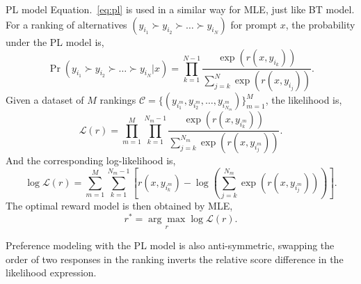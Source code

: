 PL model Equation.~\ref{eq:pl} is used in a similar way for MLE, just like BT model. For a ranking of alternatives $(y_{i_1} \succ y_{i_2} \succ \ldots \succ y_{i_N})$ for prompt $x$, the probability under the PL model is,
\begin{equation}
	\Pr(y_{i_1} \succ y_{i_2} \succ \ldots \succ y_{i_N} | x) = \prod_{k=1}^{N-1} \frac{\exp(r(x, y_{i_k}))}{\sum_{j=k}^{N} \exp(r(x, y_{i_j}))}.
\end{equation}
Given a dataset of $M$ rankings $\mathcal{C} = \{(y_{i_1^m}, y_{i_2^m}, \ldots, y_{i_{N_m}^m})\}_{m=1}^M$, the likelihood is,
\begin{equation}
	\mathcal{L}(r) = \prod_{m=1}^{M} \prod_{k=1}^{N_m-1} \frac{\exp(r(x, y_{i_k^m}))}{\sum_{j=k}^{N_m} \exp(r(x, y_{i_j^m}))}.
\end{equation}
And the corresponding log-likelihood is,
\begin{equation}
\log \mathcal{L}(r) = \sum_{m=1}^{M} \sum_{k=1}^{N_m-1} \left[ r(x, y_{i_k^m}) - \log\left(\sum_{j=k}^{N_m} \exp(r(x, y_{i_j^m}))\right) \right].
\end{equation}
The optimal reward model is then obtained by MLE,
\begin{equation}
r^* = \underset{r}{\arg\max} \log \mathcal{L}(r).
\end{equation}

Preference modeling with the PL model is also anti-symmetric, swapping the order of two responses in the ranking inverts the relative score difference in the likelihood expression.

